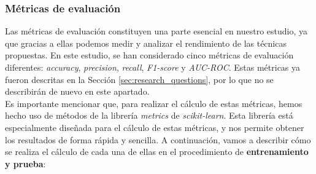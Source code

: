 \subsubsection{Métricas de evaluación}
Las métricas de evaluación constituyen una parte esencial en nuestro estudio, ya que gracias a
ellas podemos medir y analizar el rendimiento de las técnicas propuestas. En este estudio, se
han considerado cinco métricas de evaluación diferentes: \textit{accuracy}, \textit{precision},
\textit{recall}, \textit{F1-score} y \textit{AUC-ROC}. Estas métricas ya fueron descritas en la
Sección \ref{sec:research_questions}, por lo que no se describirán de nuevo en este apartado.\\


Es importante mencionar que, para realizar el cálculo de estas métricas, hemos hecho uso de
métodos de la librería \textit{metrics} de \textit{scikit-learn}. Esta librería está especialmente
diseñada para el cálculo de estas métricas, y nos permite obtener los resultados de forma
rápida y sencilla. A continuación, vamos a describir cómo se realiza el cálculo de cada una de
ellas en el procedimiento de \textbf{entrenamiento y prueba}:

